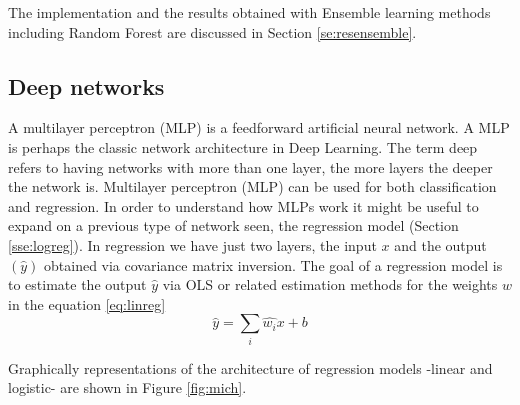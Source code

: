 \documentclass[11pt]{article}
\theoremstyle{definition}
\theoremstyle{remark}
\begin{document}
{The implementation and the results obtained with Ensemble learning methods including Random Forest are discussed in Section \ref{se:resensemble}.


\subsection{Deep networks}
\label{se:deep}

A multilayer perceptron (MLP) is a feedforward artificial neural network. A MLP is perhaps the classic network architecture in Deep Learning. The term deep refers to having networks with more than one layer, the more layers the deeper the network is.
Multilayer perceptron (MLP) can be used for both classification and regression. In order to understand how MLPs work it might be useful to expand on a previous type of network seen, the regression model (Section \ref{sse:logreg}). In regression we have just two layers, the input $x$ and the output $(\hat{y})$ obtained via covariance matrix inversion. The goal of a regression model is to estimate the output $\hat{y}$ via OLS or related estimation methods for the weights $\hat{w}$ in the equation \ref{eq:linreg}
\begin{equation}
\hat{y} = \sum_i \hat{w_i} x + b
\label{eq:linreg}
\end{equation}
 
Graphically representations of the architecture of regression models -linear and logistic- are shown in Figure \ref{fig:mich}. 

}
\end{document}
